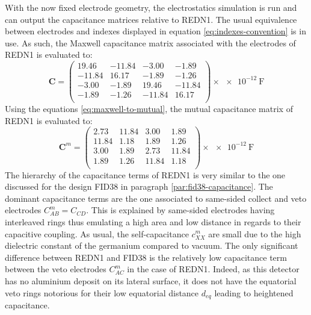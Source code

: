 With the now fixed electrode geometry, the electrostatics simulation is run and can output the capacitance matrices relative to REDN1. The usual equivalence between electrodes and indexes displayed in equation \ref{eq:indexes-convention} is in use. As such, the Maxwell capacitance matrix associated with the electrodes of REDN1 is evaluated to:
\begin{equation}
\label{eq:redn1-maxwell}
\bm{C} = 
\begin{pmatrix}
  19.46 & -11.84 & -3.00 & -1.89\\
  -11.84 & 16.17 & -1.89 & -1.26\\
  -3.00 & -1.89 & 19.46 & -11.84\\
  -1.89 & -1.26 & -11.84 & 16.17\\
\end{pmatrix}
\times \SI{e-12}{\farad}
\end{equation}
Using the equations \ref{eq:maxwell-to-mutual}, the mutual capacitance matrix of REDN1 is evaluated to:
\begin{equation}
\label{eq:redn1-mutual}
\bm{C}^m = 
\begin{pmatrix}
  2.73 & 11.84 & 3.00 & 1.89\\
  11.84 & 1.18 & 1.89 & 1.26\\
  3.00 & 1.89 & 2.73 & 11.84\\
  1.89 & 1.26 & 11.84 & 1.18\\
\end{pmatrix}
\times \SI{e-12}{\farad}
\end{equation}
The hierarchy of the capacitance terms of REDN1 is very similar to the one discussed for the design FID38 in paragraph \ref{par:fid38-capacitance}. The dominant capacitance terms are the one associated to same-sided collect and veto electrodes $C_{AB}^m=C_{CD}$. This is explained by same-sided electrodes having interleaved rings thus emulating a high area and low distance in regards to their capacitive coupling.
As usual, the self-capacitance $c_{XX}^m$ are small due to the high dielectric constant of the germanium compared to vacuum.
The only significant difference between REDN1 and FID38 is the relatively low capacitance term between the veto electrodes $C_{AC}^m$ in the case of REDN1. Indeed, as this detector has no aluminium deposit on its lateral surface, it does not have the equatorial veto rings notorious for their low equatorial distance $d_{eq}$ leading to heightened capacitance. 

